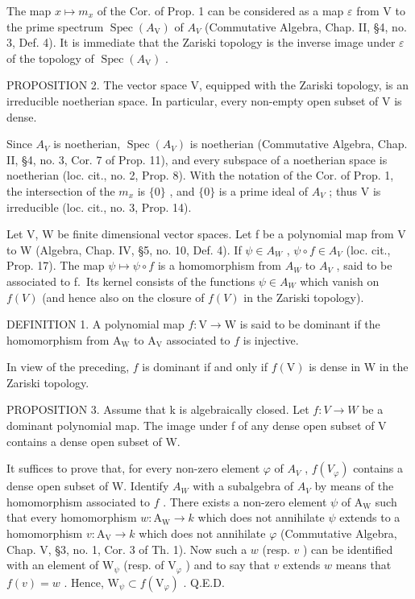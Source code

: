 The map \(x \mapsto m_{x}\) of the Cor. of Prop. 1 can be considered as a map \(\varepsilon\) from V to the prime spectrum \(\operatorname{Spec}(A_{\mathrm{V}})\) of \(A_{V}\) (Commutative Algebra, Chap. II, §4, no. 3, Def. 4). It is immediate that the Zariski topology is the inverse image under \(\varepsilon\) of the topology of \(\operatorname{Spec}(A_{\mathrm{V}})\) .

PROPOSITION 2. The vector space V, equipped with the Zariski topology, is an irreducible noetherian space. In particular, every non-empty open subset of V is dense.

Since \(A_{V}\) is noetherian, \(\operatorname{Spec}(A_{V})\) is noetherian (Commutative Algebra, Chap. II, §4, no. 3, Cor. 7 of Prop. 11), and every subspace of a noetherian space is noetherian (loc. cit., no. 2, Prop. 8). With the notation of the Cor. of Prop. 1, the intersection of the \(m_{x}\) is \(\{0\}\) , and \(\{0\}\) is a prime ideal of \(A_{V}\) ; thus V is irreducible (loc. cit., no. 3, Prop. 14).


Let V, W be finite dimensional vector spaces. Let f be a polynomial map from V to W (Algebra, Chap. IV, §5, no. 10, Def. 4). If \(\psi \in A_{W}\) , \(\psi \circ f \in A_{V}\) (loc. cit., Prop. 17). The map \(\psi \mapsto \psi \circ f\) is a homomorphism from \(A_{W}\) to \(A_{V}\) , said to be associated to f.~Its kernel consists of the functions \(\psi \in A_{W}\) which vanish on \(f(V)\) (and hence also on the closure of \(f(V)\) in the Zariski topology).

DEFINITION 1. A polynomial map \(f: \mathrm{V} \to \mathrm{W}\) is said to be dominant if the homomorphism from \(\mathrm{A_W}\) to \(\mathrm{A_V}\) associated to \(f\) is injective.

In view of the preceding, \(f\) is dominant if and only if \(f(\mathrm{V})\) is dense in W in the Zariski topology.

PROPOSITION 3. Assume that k is algebraically closed. Let \(f : V \to W\) be a dominant polynomial map. The image under f of any dense open subset of V contains a dense open subset of W.

It suffices to prove that, for every non-zero element \(\varphi\) of \(A_{V}\) , \(f(V_{\varphi})\) contains a dense open subset of W. Identify \(A_{W}\) with a subalgebra of \(A_{V}\) by means of the homomorphism associated to \(f\) . There exists a non-zero element \(\psi\) of \(\mathrm{A_W}\) such that every homomorphism \(w: \mathrm{A_W} \to k\) which does not annihilate \(\psi\) extends to a homomorphism \(v: \mathrm{A_V} \to k\) which does not annihilate \(\varphi\) (Commutative Algebra, Chap. V, §3, no. 1, Cor. 3 of Th. 1). Now such a \(w\) (resp. \(v\) ) can be identified with an element of \(\mathrm{W}_{\psi}\) (resp. of \(\mathrm{V}_{\varphi}\) ) and to say that \(v\) extends \(w\) means that \(f(v) = w\) . Hence, \(\mathrm{W}_{\psi} \subset f(\mathrm{V}_{\varphi})\) . Q.E.D.


